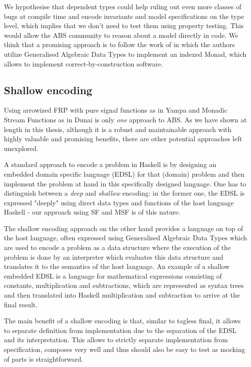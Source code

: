 We hypothesise that dependent types could help ruling out even more classes of bugs at compile time and encode invariants and model specifications on the type level, which implies that we don't need to test them using property testing. This would allow the ABS community to reason about a model directly in code. We think that a promising approach is to follow the work of \cite{brady_programming_2013, brady_state_2016, fowler_dependent_2014} in which the authors utilize Generalised Algebraic Data Types to implement an indexed Monad, which allows to implement correct-by-construction software. %

\subsection{Shallow encoding}
Using arrowized FRP with pure signal functions as in Yampa and Monadic Stream Functions as in Dunai is only \textit{one} approach to ABS. As we have shown at length in this thesis, although it is a robust and maintainable approach with highly valuable and promising benefits, there are other potential approaches left unexplored.

A standard approach to encode a problem in Haskell is by designing an embedded domain specific language (EDSL) for that (domain) problem and then implement the problem at hand in this specifically designed language. One has to distinguish between a \textit{deep} and \textit{shallow} encoding: in the former one, the EDSL is expressed "deeply" using direct data types and functions of the host language Haskell - our approach using SF and MSF is of this nature.

The shallow encoding approach on the other hand provides a language on top of the host language, often expressed using Generalised Algebraic Data Types which are used to encode a problem as a data structure where the execution of the problem is done by an interpreter which evaluates this data structure and translates it to the semantics of the host language. An example of a shallow embedded EDSL is a language for mathematical expressions consisting of constants, multiplication and subtractions, which are represented as syntax trees and then translated into Haskell multiplication and subtraction to arrive at the final result.

The main benefit of a shallow encoding is that, similar to tagless final, it allows to separate definition from implementation due to the separation of the EDSL and its interpretation. This allows to strictly separate implementation from specification, composes very well and thus should also be easy to test as mocking of parts is straightforward.

